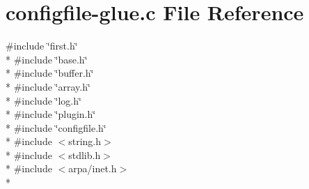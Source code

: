\hypertarget{configfile-glue_8c}{\section{configfile-\/glue.c File Reference}
\label{configfile-glue_8c}
}
{\ttfamily \#include \char`\"{}first.\-h\char`\"{}}\\*
{\ttfamily \#include \char`\"{}base.\-h\char`\"{}}\\*
{\ttfamily \#include \char`\"{}buffer.\-h\char`\"{}}\\*
{\ttfamily \#include \char`\"{}array.\-h\char`\"{}}\\*
{\ttfamily \#include \char`\"{}log.\-h\char`\"{}}\\*
{\ttfamily \#include \char`\"{}plugin.\-h\char`\"{}}\\*
{\ttfamily \#include \char`\"{}configfile.\-h\char`\"{}}\\*
{\ttfamily \#include $<$string.\-h$>$}\\*
{\ttfamily \#include $<$stdlib.\-h$>$}\\*
{\ttfamily \#include $<$arpa/inet.\-h$>$}\\*
